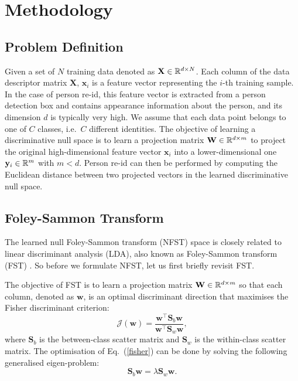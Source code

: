 \documentclass[10pt,twocolumn,letterpaper]{article}
\begin{document}
\section{Methodology}
\subsection{Problem Definition}

Given a set of $N$ training data denoted as $\mathbf{X} \in \Bbb{R}^{d \times N}$. Each column of the data descriptor matrix $\mathbf{X}$, $\mathbf{x}_i$ is a feature vector representing the $i$-th training sample.  In the case of person re-id, this feature vector is extracted from a person detection box and contains appearance information about the person, and its dimension $d$ is typically very high. We assume that each data point belongs to one of  $C$ classes, i.e.~$C$ different identities. The objective of learning a discriminative null space is to learn a projection matrix $\mathbf{W} \in \Bbb{R}^{d \times m}$ to project the original high-dimensional feature vector $\mathbf{x}_i$ into a lower-dimensional one $\mathbf{y}_i \in \Bbb{R}^{m}$ with $m<d$. Person re-id can then be performed by computing the Euclidean distance between two projected vectors in the learned discriminative null space. 

\subsection{Foley-Sammon Transform}
The learned null  Foley-Sammon transform (NFST) space is closely related to linear discriminant analysis (LDA), also known as Foley-Sammon transform (FST) \cite{NFS_75}. So before we formulate NFST, let us first briefly revisit  FST. 

The objective of FST is to learn a projection matrix $\mathbf{W} \in \Bbb{R}^{d \times m}$ so that each column, denoted as $\mathbf{w}$, is an optimal discriminant direction that maximises the Fisher discriminant criterion:
\begin{equation}\label{fisher}
\mathcal{J}(\mathbf{w}) = \frac{\mathbf{w}^{\top}\mathbf{S}_{b} \mathbf{w} }{\mathbf{w}^{\top}\mathbf{S}_{w} \mathbf{w} },
\end{equation}
where $\mathbf{S}_{b}$ is the  between-class scatter matrix and $\mathbf{S}_{w}$ is the  within-class scatter matrix. The optimisation of Eq.~(\ref{fisher}) can be done by solving the following generalised eigen-problem:
\begin{equation} 
\mathbf{S}_{b} \mathbf{w} = \lambda \mathbf{S}_{w} \mathbf{w}.
\end{equation}
\end{document}
